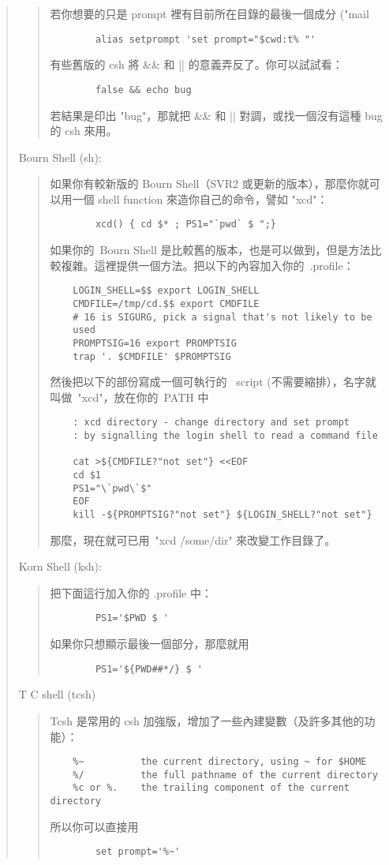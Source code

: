 \documentclass{article}
\begin{document}
\begin{CJK*}{Bg5}{ming}
\begin{quote}
\begin{quote}
	  若你想要的只是 prompt 裡有目前所在目錄的最後一個成分
	  ("mail%
\begin{verbatim}
		alias setprompt 'set prompt="$cwd:t% "'
\end{verbatim}
	  有些舊版的 csh 將 \&\& 和 || 的意義弄反了。你可以試試看：
\begin{verbatim}
		false && echo bug
\end{verbatim}
	  若結果是印出 "bug"，那就把 \&\& 和 || 對調，或找一個沒有這種 
	  bug 的 csh 來用。
	\end{quote}

	Bourn Shell (sh):
	\begin{quote}
	  如果你有較新版的 Bourn Shell（SVR2 或更新的版本），那麼你就可
	  以用一個 shell function 來造你自己的命令，譬如 "xcd"：
\begin{verbatim}
		xcd() { cd $* ; PS1="`pwd` $ ";}
\end{verbatim}
	  如果你的~Bourn Shell 是比較舊的版本，也是可以做到，但是方法比
	  較複雜。這裡提供一個方法。把以下的內容加入你的~.profile：
\small
\begin{verbatim}
	LOGIN_SHELL=$$ export LOGIN_SHELL
	CMDFILE=/tmp/cd.$$ export CMDFILE
	# 16 is SIGURG, pick a signal that's not likely to be 
	used
	PROMPTSIG=16 export PROMPTSIG
	trap '. $CMDFILE' $PROMPTSIG
\end{verbatim}
\normalsize
	然後把以下的部份寫成一個可執行的 ~script (不需要縮排），名字就
	叫做~"xcd"，放在你的~PATH 中
\small
\begin{verbatim}
	: xcd directory - change directory and set prompt
	: by signalling the login shell to read a command file

	cat >${CMDFILE?"not set"} <<EOF
	cd $1
	PS1="\`pwd\`$"
	EOF
	kill -${PROMPTSIG?"not set"} ${LOGIN_SHELL?"not set"}
\end{verbatim}
\normalsize
	那麼，現在就可已用~"xcd /some/dir" 來改變工作目錄了。
	\end{quote}

	Korn Shell (ksh):
	\begin{quote}
	  把下面這行加入你的 .profile 中：
\begin{verbatim}
		PS1='$PWD $ '
\end{verbatim}
	  如果你只想顯示最後一個部分，那麼就用
\begin{verbatim}
		PS1='${PWD##*/} $ '
\end{verbatim}
	\end{quote}

	T C shell (tcsh)
	\begin{quote}
	  Tcsh 是常用的 csh 加強版，增加了一些內建變數（及許多其他的功
	  能）：
\small
\begin{verbatim}
	%~          the current directory, using ~ for $HOME
	%/          the full pathname of the current directory
	%c or %.    the trailing component of the current directory
\end{verbatim}
\normalsize
	  所以你可以直接用
\begin{verbatim}
		set prompt='%~'
\end{verbatim}
	\end{quote}


\end{quote}
\end{CJK*}
\end{document}
